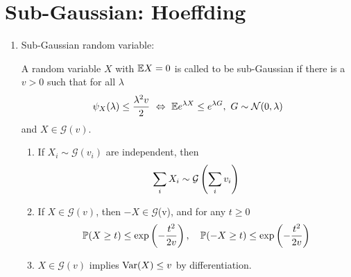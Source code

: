 \section{Sub-Gaussian: Hoeffding}
\begin{enumerate}[label=\arabic{*}.]
	\item Sub-Gaussian random variable:
	\begin{defn}
	    A random variable $X$ with $\mathbb{E} X = 0$ is called to be sub-Gaussian if there is a $v > 0$ such that for all $\lambda$
	    \begin{equation*}
	    	\psi_X(\lambda) \leq \frac{\lambda^2v}{2}~\Leftrightarrow~ \mathbb{E} e^{\lambda X} \leq e^{\lambda G},~G \sim \mathcal{N}(0,\lambda)
	    \end{equation*}
	   	and $X \in \mathcal{G}(v)$.
	\end{defn}
	\begin{prop}
	    \begin{enumerate}[label=(\arabic{*})]
	    	\item If $X_i \sim \mathcal{G}(v_i)$ are independent, then
	    	\begin{equation*}
	    		\sum_iX_i \sim \mathcal{G}\left(\sum_iv_i\right)
	    	\end{equation*}

	    	\item  If $X \in \mathcal{G}(v)$, then $-X \in \mathcal{G}$(v), and for any $t \geq 0$
	    	\begin{equation*}
	    		\mathbb{P}(X \geq t) \leq \exp\left(-\frac{t^2}{2v}\right),\quad \mathbb{P}(-X \geq t) \leq \exp\left(-\frac{t^2}{2v}\right)
	    	\end{equation*}

	    	\item $X \in \mathcal{G}(v)$ implies $\operatorname{Var}(X) \leq v$ by differentiation.
	    \end{enumerate}
	\end{prop}


\end{enumerate}
